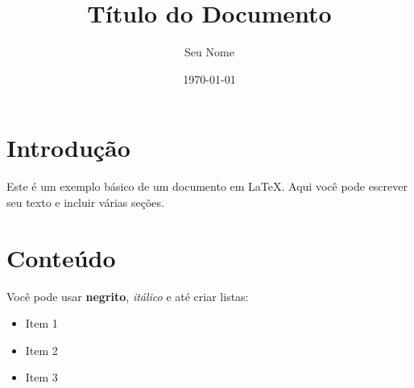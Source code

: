 \documentclass{article} %
\title{Título do Documento} %
\author{Seu Nome} %
\date{\today} %
\begin{document}

\maketitle %

\section{Introdução} %
Este é um exemplo básico de um documento em LaTeX. Aqui você pode escrever seu texto e incluir várias seções.

\section{Conteúdo} %
Você pode usar \textbf{negrito}, \textit{itálico} e até criar listas:
\begin{itemize} %
    \item Item 1
    \item Item 2
    \item Item 3
\end{itemize}
\end{document}
